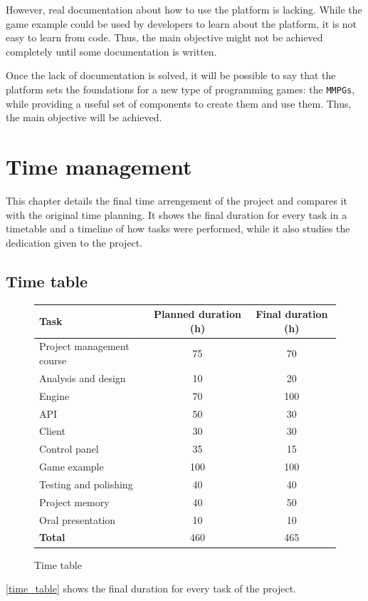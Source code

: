 \documentclass[a4paper,11pt,titlepage,abstract,numbers=noenddot,automark,mnsy,intlimits,rgb,dvipsnames]{report}
\begin{document}
However, real documentation about how to use the platform is lacking. While the game example could be used by developers to
learn about the platform, it is not easy to learn from code. Thus, the main objective might not be
achieved completely until some documentation is written.

Once the lack of documentation is solved, it will be possible to say that the platform sets the foundations for a
new type of programming games: the \texttt{MMPGs}, while providing a useful set of components to create them and use them. Thus,
the main objective will be achieved.
\chapter{Time management}
This chapter details the final time arrengement of the project and compares it with the original time planning.
It shows the final duration for every task in a timetable and a timeline of how tasks were performed, while it
also studies the dedication given to the project.
\section{Time table}
\begin{figure}[H]
\begin{center}
\begin{tabular}{l S S}
\textbf{Task} & \textbf{Planned duration (h)} & \textbf{Final duration (h)}\\
\hline
Project management course & 75 & 70\\
Analysis and design & 10 & 20\\
Engine & 70 & 100\\
API & 50 & 30\\
Client & 30 & 30\\
Control panel & 35 & 15\\
Game example & 100 & 100\\
Testing and polishing & 40 & 40\\
Project memory & 40 & 50\\
Oral presentation & 10 & 10\\
\hline
\hline
\textbf{Total} & 460 & 465\\
\end{tabular}
\end{center}
\caption{Time table}
\label{time_table}
\end{figure}
\autoref{time_table} shows the final duration for every task of the project.
\end{document}

